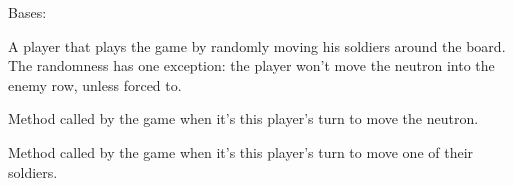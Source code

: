 \documentclass[letterpaper,10pt,english,openany,oneside]{sphinxmanual}
\begin{document}

\begin{fulllineitems}
\label{\detokenize{player:player.RandomPlayer}}
Bases: {\hyperref[\detokenize{player:player.Player}]{}}

A player that plays the game by randomly moving his soldiers around the
board. The randomness has one exception: the player won’t move the neutron
into the enemy row, unless forced to.

\begin{fulllineitems}
\label{\detokenize{player:player.RandomPlayer.move_neutron}}
Method called by the game when it’s this player’s turn to move the
neutron.

\end{fulllineitems}


\begin{fulllineitems}
\label{\detokenize{player:player.RandomPlayer.move_soldier}}
Method called by the game when it’s this player’s turn to move one of
their soldiers.

\end{fulllineitems}


\end{fulllineitems}

\end{document}
